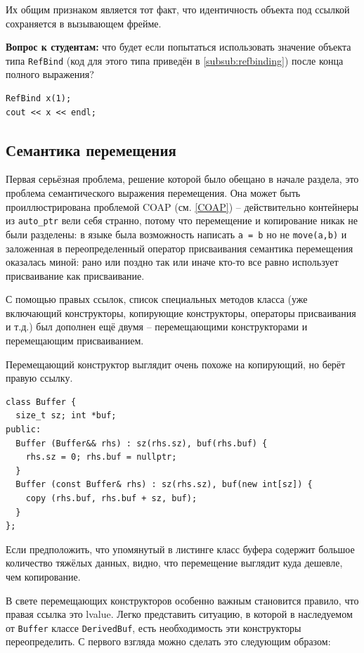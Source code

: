 \documentclass[a4paper,12pt,oneside]{book}
\newif\ifanswers
\begin{document}
Их общим признаком является тот факт, что идентичность объекта под ссылкой сохраняется в вызывающем фрейме.

\textbf{Вопрос к студентам:} что будет если попытаться использовать значение объекта типа \lstinline!RefBind! (код для этого типа приведён в \ref{subsub:refbinding}) после конца полного выражения?

\begin{lstlisting}
RefBind x(1);
cout << x << endl;
\end{lstlisting}

\ifanswers
Правильный ответ: dangling rvalue reference.
\fi

\subsection{Семантика перемещения}\label{subsub:movesemantics}

Первая серьёзная проблема, решение которой было обещано в начале раздела, это проблема семантического выражения перемещения. Она может быть проиллюстрирована проблемой COAP (см. \ref{COAP}) -- действительно контейнеры из \lstinline!auto_ptr! вели себя странно, потому что перемещение и копирование никак не были разделены: в языке была возможность написать \lstinline!a = b! но не \lstinline!move(a,b)! и заложенная в переопределенный оператор присваивания семантика перемещения оказалась миной: рано или поздно так или иначе кто-то все равно использует присваивание как присваивание.

С помощью правых ссылок, список специальных методов класса (уже включающий конструкторы, копирующие конструкторы, операторы присваивания и т.д.) был дополнен ещё двумя -- перемещающими конструкторами и перемещающим присваиванием.

Перемещающий конструктор выглядит очень похоже на копирующий, но берёт правую ссылку.

\begin{lstlisting}
class Buffer {
  size_t sz; int *buf;
public:
  Buffer (Buffer&& rhs) : sz(rhs.sz), buf(rhs.buf) { 
    rhs.sz = 0; rhs.buf = nullptr; 
  }
  Buffer (const Buffer& rhs) : sz(rhs.sz), buf(new int[sz]) { 
    copy (rhs.buf, rhs.buf + sz, buf); 
  }
};
\end{lstlisting}

Если предположить, что упомянутый в листинге класс буфера содержит большое количество тяжёлых данных, видно, что перемещение выглядит куда дешевле, чем копирование.

В свете перемещающих конструкторов особенно важным становится правило, что правая ссылка это lvalue. Легко представить ситуацию, в которой в наследуемом от \lstinline!Buffer! классе \lstinline!DerivedBuf!, есть необходимость эти конструкторы переопределить. С первого взгляда можно сделать это следующим образом:
\end{document}
